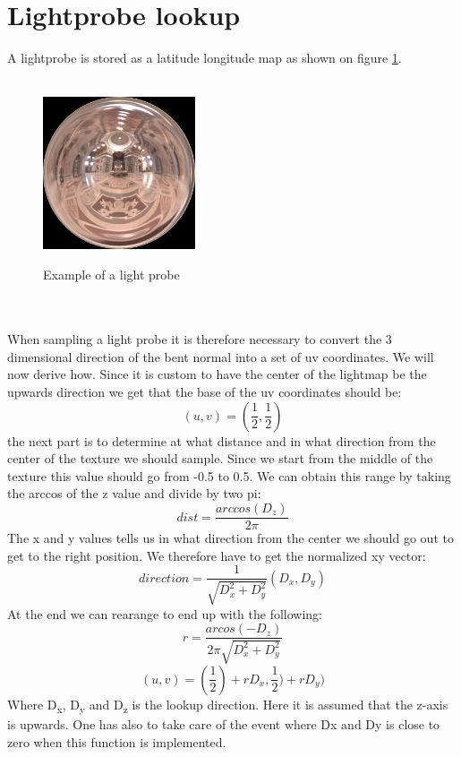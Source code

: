 \section{Lightprobe lookup}
A lightprobe is stored as a latitude longitude map as shown on figure \ref{fig:probe}.
\\ \\
\begin{figure}[h]
	\centering
	\includegraphics[width=0.4\textwidth]{Theory/example_probe}
	\label{fig:probe}
	\caption{Example of a light probe}
\end{figure}
\\ \\
When sampling a light probe it is therefore necessary to convert the 3 dimensional direction of the bent normal into a set of uv coordinates. We will now derive how. Since it is custom to have the center of the lightmap be the upwards direction we get that the base of the uv coordinates should be:
\[
(u,v) = (\frac{1}{2}, \frac{1}{2})
\]
the next part is to determine at what distance and in what direction from the center of the texture we should sample. Since we start from the middle of the texture this value should go from -0.5 to 0.5. We can obtain this range by taking the arccos of the z value and divide by two pi:
\[
dist = \frac{arccos(D_z)}{2\pi}
\]
The x and y values tells us in what direction from the center we should go out to get to the right position. We therefore have to get the normalized xy vector:
\[
direction = \frac{1}{\sqrt{D_x^2 +D_y^2}} (D_x,D_y)
\]
At the end we can rearange to end up with the following:
\[
r = \frac{arcos(-D_z)}{2\pi\sqrt{D_x^2 + D_y^2}} 
\] \[
(u,v) = (\frac{1}{2}) + rD_x,\frac{1}{2}) + rD_y)
\]
Where D\textsubscript{x}, D\textsubscript{y} and D\textsubscript{z} is the lookup direction. Here it is assumed that the z-axis is upwards. One has also to take care of the event where Dx and Dy is close to zero when this function is implemented.

